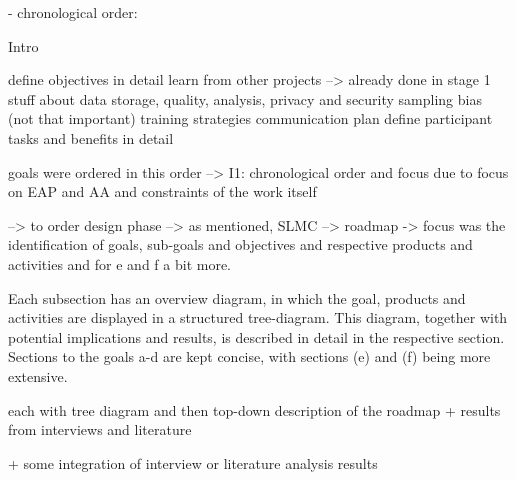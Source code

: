 - chronological order:



























Intro

define objectives in detail
learn from other projects --> already done in stage 1
stuff about data storage, quality, analysis, privacy and security 
sampling bias (not that important)
training strategies
communication plan
define participant tasks and benefits in detail 

goals were ordered in this order --> I1: chronological order and focus due to focus on EAP and AA and constraints of the work itself

--> to order design phase --> as mentioned, SLMC
--> roadmap -> focus was the identification of goals, sub-goals and objectives and respective products and activities and for e and f a bit more. 



Each subsection has an overview diagram, in which the goal, products and activities are displayed in a structured tree-diagram. This diagram, together with potential implications and results, is described in detail in the respective section. Sections to the goals a-d are kept concise, with sections (e) and (f) being more extensive.



each with tree diagram %
and then top-down description of the roadmap
+ results from interviews and literature

+ some integration of interview or literature analysis results 

